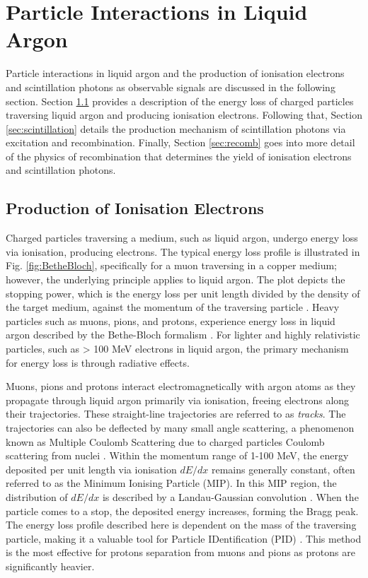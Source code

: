 \section{Particle Interactions in Liquid Argon}
\label{sec3:creation}

Particle interactions in liquid argon and the production of ionisation electrons and scintillation photons as observable signals are discussed in the following section.       
Section \ref{sec3:bethebloch} provides a description of the energy loss of charged particles traversing liquid argon and producing ionisation electrons.                          
Following that, Section \ref{sec:scintillation} details the production mechanism of scintillation photons via excitation and recombination.                                       
Finally, Section \ref{sec:recomb} goes into more detail of the physics of recombination that determines the yield of ionisation electrons and scintillation photons.

\subsection{Production of Ionisation Electrons}
\label{sec3:bethebloch}

Charged particles traversing a medium, such as liquid argon, undergo energy loss via ionisation, producing electrons.                                                                       
The typical energy loss profile is illustrated in Fig. \ref{fig:BetheBloch}, specifically for a muon traversing in a copper medium; however, the underlying principle applies to liquid argon.
The plot depicts the stopping power, which is the energy loss per unit length divided by the density of the target medium, against the momentum of the traversing particle \cite{Passage}.
Heavy particles such as muons, pions, and protons, experience energy loss in liquid argon described by the Bethe-Bloch formalism \cite{Passage}.
For lighter and highly relativistic particles, such as > 100 MeV electrons in liquid argon, the primary mechanism for energy loss is through radiative effects.

Muons, pions and protons interact electromagnetically with argon atoms as they propagate through liquid argon primarily via ionisation, freeing electrons along their trajectories.
These straight-line trajectories are referred to as \textit{tracks}.
The trajectories can also be deflected by many small angle scattering, a phenomenon known as Multiple Coulomb Scattering due to charged particles Coulomb scattering from nuclei \cite{Passage}. 
Within the momentum range of 1-100 MeV, the energy deposited per unit length via ionisation $dE/dx$ remains generally constant, often referred to as the Minimum Ionising Particle (MIP).
In this MIP region, the distribution of $dE/dx$ is described by a Landau-Gaussian convolution \cite{Passage}. 
When the particle comes to a stop, the deposited energy increases, forming the Bragg peak.
The energy loss profile described here is dependent on the mass of the traversing particle, making it a valuable tool for Particle IDentification (PID) \cite{argoneut}.
This method is the most effective for protons separation from muons and pions as protons are significantly heavier.

